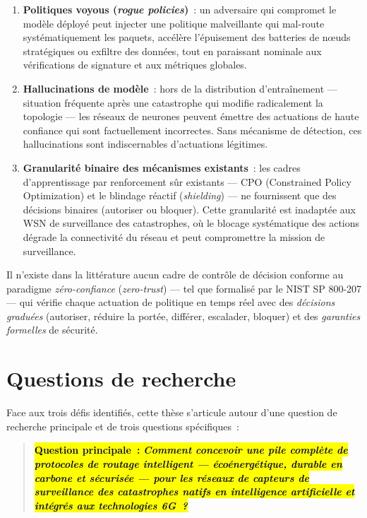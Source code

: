 \begin{enumerate}
    \item \textbf{Politiques voyous (\emph{rogue policies})}~: un adversaire qui compromet le modèle déployé peut injecter une politique malveillante qui mal-route systématiquement les paquets, accélère l'épuisement des batteries de n\oe{}uds stratégiques ou exfiltre des données, tout en paraissant nominale aux vérifications de signature et aux métriques globales.
    \item \textbf{Hallucinations de modèle}~: hors de la distribution d'entraînement --- situation fréquente après une catastrophe qui modifie radicalement la topologie --- les réseaux de neurones peuvent émettre des actuations de haute confiance qui sont factuellement incorrectes. Sans mécanisme de détection, ces hallucinations sont indiscernables d'actuations légitimes.
    \item \textbf{Granularité binaire des mécanismes existants}~: les cadres d'apprentissage par renforcement sûr existants --- CPO (Constrained Policy Optimization) \cite{achiam2017cpo} et le blindage réactif (\emph{shielding}) \cite{alshiekh2018shielding} --- ne fournissent que des décisions binaires (autoriser ou bloquer). Cette granularité est inadaptée aux WSN de surveillance des catastrophes, où le blocage systématique des actions dégrade la connectivité du réseau et peut compromettre la mission de surveillance.
\end{enumerate}

Il n'existe dans la littérature aucun cadre de contrôle de décision conforme au paradigme \emph{zéro-confiance} (\emph{zero-trust}) --- tel que formalisé par le NIST SP 800-207 \cite{rose2020nist} --- qui vérifie chaque actuation de politique en temps réel avec des \emph{décisions graduées} (autoriser, réduire la portée, différer, escalader, bloquer) et des \emph{garanties formelles} de sécurité.


\section{Questions de recherche}\label{sec:Questions}

Face aux trois défis identifiés, cette thèse s'articule autour d'une question de recherche principale et de trois questions spécifiques~:

\medskip
\begin{quote}
\hl{\textbf{Question principale~:} \textbf{\emph{Comment concevoir une pile complète de protocoles de routage intelligent --- écoénergétique, durable en carbone et sécurisée --- pour les réseaux de capteurs de surveillance des catastrophes natifs en intelligence artificielle et intégrés aux technologies 6G~?}}}
\end{quote}


